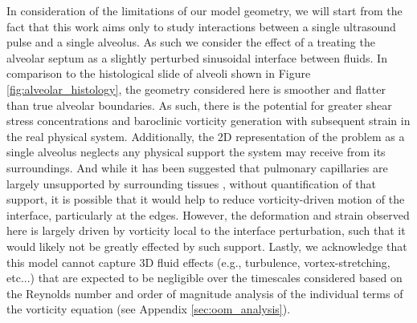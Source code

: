 In consideration of the limitations of our model geometry, we will
start from the fact that this work aims only to study interactions
between a single ultrasound pulse and a single alveolus. As such we
consider the effect of a treating the alveolar septum as a slightly
perturbed sinusoidal interface between fluids. In comparison to the
histological slide of alveoli shown in Figure
\ref{fig:alveolar_histology}, the geometry considered here is smoother
and flatter than true alveolar boundaries. As such, there is the
potential for greater shear stress concentrations and baroclinic
vorticity generation with subsequent strain in the real physical
system. Additionally, the 2D representation of the problem as a single
alveolus neglects any physical support the system may receive from its
surroundings. And while it has been suggested that pulmonary
capillaries are largely unsupported by surrounding tissues
\citep{West1991}, without quantification of that support, it is
possible that it would help to reduce vorticity-driven motion of the
interface, particularly at the edges. However, the deformation and
strain observed here is largely driven by vorticity local to the
interface perturbation, such that it would likely not be greatly
effected by such support. Lastly, we acknowledge that this model
cannot capture 3D fluid effects (e.g., turbulence, vortex-stretching,
etc...) that are expected to be negligible over the timescales
considered based on the Reynolds number and order of magnitude
analysis of the individual terms of the vorticity equation (see
Appendix \ref{sec:oom_analysis}).

